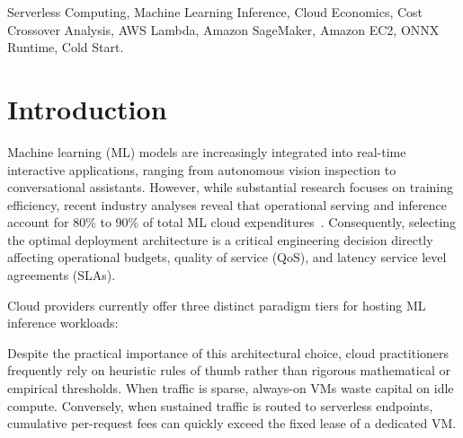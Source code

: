 \documentclass[conference]{IEEEtran}
\begin{document}
\begin{IEEEkeywords}
Serverless Computing, Machine Learning Inference, Cloud Economics, Cost Crossover Analysis, AWS Lambda, Amazon SageMaker, Amazon EC2, ONNX Runtime, Cold Start.
\end{IEEEkeywords}

\section{Introduction}
Machine learning (ML) models are increasingly integrated into real-time interactive applications, ranging from autonomous vision inspection to conversational assistants. However, while substantial research focuses on training efficiency, recent industry analyses reveal that operational serving and inference account for 80\% to 90\% of total ML cloud expenditures~\cite{jonas2019cloud, romero2021infless}. Consequently, selecting the optimal deployment architecture is a critical engineering decision directly affecting operational budgets, quality of service (QoS), and latency service level agreements (SLAs).

Cloud providers currently offer three distinct paradigm tiers for hosting ML inference workloads:

Despite the practical importance of this architectural choice, cloud practitioners frequently rely on heuristic rules of thumb rather than rigorous mathematical or empirical thresholds. When traffic is sparse, always-on VMs waste capital on idle compute. Conversely, when sustained traffic is routed to serverless endpoints, cumulative per-request fees can quickly exceed the fixed lease of a dedicated VM.
\end{document}
